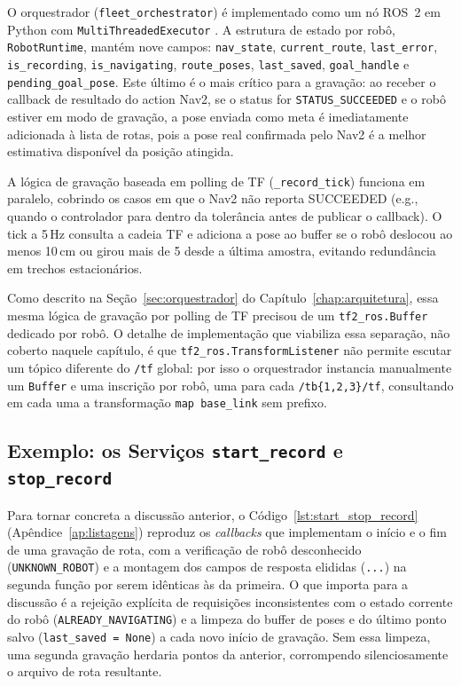 O orquestrador (\texttt{fleet\_\allowbreak orchestrator}) é implementado como um nó ROS~2 em Python
com \texttt{MultiThreadedExecutor} \cite{macenski2022ros2}. A estrutura de estado por robô, \texttt{RobotRuntime},
mantém nove campos: \texttt{nav\_\allowbreak state}, \texttt{current\_\allowbreak route},
\texttt{last\_\allowbreak error}, \texttt{is\_\allowbreak recording}, \texttt{is\_\allowbreak navigating},
\texttt{route\_\allowbreak poses}, \texttt{last\_\allowbreak saved}, \texttt{goal\_\allowbreak handle} e
\texttt{pending\_\allowbreak goal\_\allowbreak pose}. Este último
é o mais crítico para a gravação: ao receber o callback de resultado do action Nav2,
se o status for \texttt{STATUS\_\allowbreak SUCCEEDED} e o robô estiver em modo de gravação,
a pose enviada como meta é imediatamente adicionada à lista de rotas, pois a pose
real confirmada pelo Nav2 é a melhor estimativa disponível da posição atingida.

A lógica de gravação baseada em polling de TF (\texttt{\_\allowbreak record\_\allowbreak tick}) funciona em
paralelo, cobrindo os casos em que o Nav2 não reporta SUCCEEDED (e.g., quando o controlador
para dentro da tolerância antes de publicar o callback). O tick a 5\,Hz consulta a
cadeia TF e adiciona a pose ao buffer se o robô deslocou ao menos 10\,cm ou girou
mais de 5\textdegree{} desde a última amostra, evitando redundância em trechos estacionários.

Como descrito na Seção~\ref{sec:orquestrador} do Capítulo~\ref{chap:arquitetura},
essa mesma lógica de gravação por polling de TF precisou de um
\texttt{tf2\_\allowbreak ros.\allowbreak Buffer} dedicado por robô. O detalhe de implementação que
viabiliza essa separação, não coberto naquele capítulo, é que
\texttt{tf2\_\allowbreak ros.\allowbreak TransformListener} não permite escutar um tópico diferente
do \texttt{/tf} global: por isso o orquestrador instancia manualmente um
\texttt{Buffer} e uma inscrição por robô, uma para cada \texttt{/tb\{1,2,3\}/\allowbreak tf},
consultando em cada uma a transformação \texttt{map \textrightarrow{} base\_\allowbreak link} sem prefixo.


\subsection{Exemplo: os Serviços \texttt{start\_\allowbreak record} e \texttt{stop\_\allowbreak record}}
\label{sec:impl_servicos_exemplo}

Para tornar concreta a discussão anterior, o Código~\ref{lst:start_stop_record}
(Apêndice~\ref{ap:listagens}) reproduz os \textit{callbacks} que implementam o início e o fim de uma gravação de
rota, com a verificação de robô desconhecido (\texttt{UNKNOWN\_\allowbreak ROBOT}) e a montagem
dos campos de resposta elididas (\texttt{...}) na segunda função por serem idênticas
às da primeira. O que importa para a discussão é a rejeição explícita de
requisições inconsistentes com o estado corrente do robô
(\texttt{ALREADY\_\allowbreak NAVIGATING}) e a limpeza do buffer de poses e do último ponto
salvo (\texttt{last\_\allowbreak saved = None}) a cada novo início de gravação. Sem essa
limpeza, uma segunda gravação herdaria pontos da anterior, corrompendo
silenciosamente o arquivo de rota resultante.

